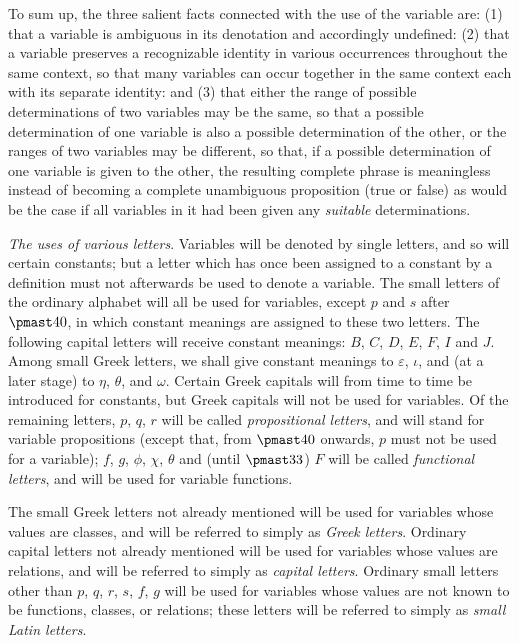 \documentclass[letterpaper,12pt,openany,leqno]{book}
\newcommand{\pagefirst}[1]{\marginnote[\boxed{\text{#1}}]{\boxed{\text{#1}}}}
\begin{document}
\pagefirst{5} To sum up, the three salient facts connected with the use of the variable are: (1) that a variable is ambiguous in its denotation and accordingly undefined: (2) that a variable preserves a recognizable identity in various occurrences throughout the same context, so that many variables can occur together in the same context each with its separate identity: and (3) that either the range of possible determinations of two variables may be the same, so that a possible determination of one variable is also a possible determination of the other, or the ranges of two variables may be different, so that, if a possible determination of one variable is given to the other, the resulting complete phrase is meaningless instead of becoming a complete unambiguous proposition (true or false) as would be the case if all variables in it had been given any \textit{suitable} determinations.

\textit{The uses of various letters}. Variables will be denoted by single letters, and so will certain constants; but a letter which has once been assigned to a constant by a definition must not afterwards be used to denote a variable. The small letters of the ordinary alphabet will all be used for variables, except $p$ and $s$ after $\pmast40$, in which constant meanings are assigned to these two letters. The following capital letters will receive constant meanings: $B$, $C$, $D$, $E$, $F$, $I$ and $J$. Among small Greek letters, we shall give constant meanings to $\varepsilon$, $\iota$, and (at a later stage) to $\eta$, $\theta$, and $\omega$. Certain Greek capitals will from time to time be introduced for constants, but Greek capitals will not be used for variables. Of the remaining letters, $p$, $q$, $r$ will be called \textit{propositional letters}, and will stand for variable propositions (except that, from $\pmast40$ onwards, $p$ must not be used for a variable); $f$, $g$, $\phi$, $\chi$, $\theta$ and (until $\pmast33$) $F$ will be called \textit{functional letters}, and will be used for variable functions.

The small Greek letters not already mentioned will be used for variables whose values are classes, and will be referred to simply as \textit{Greek letters}. Ordinary capital letters not already mentioned will be used for variables whose values are relations, and will be referred to simply as \textit{capital letters}. Ordinary small letters other than $p$, $q$, $r$, $s$, $f$, $g$ will be used for variables whose values are not known to be functions, classes, or relations; these letters will be referred to simply as \textit{small Latin letters}. 
\end{document}
